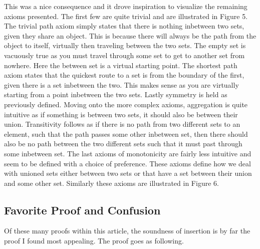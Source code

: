 \documentclass[a4paper,man,natbib]{apa6}
\begin{document}
This was a nice consequence and it drove inspiration to visualize the remaining axioms presented. 
The first few are quite trivial and are illustrated in Figure 5. 
The trivial path axiom simply states that there is nothing inbetween two sets, given they share an object. 
This is because there will always be the path from the object to itself, virtually then traveling between the two sets.
The empty set is vacuously true as you must travel through some set to get to another set from nowhere. 
Here the between set is a virtual starting point. 
The shortest path axiom states that the quickest route to a set is from the boundary of the first, given there is a set inbetween the two. 
This makes sense as you are virtually starting from a point inbetween the two sets. 
Lastly symmetry is held as previously defined. 
Moving onto the more complex axioms, aggregation is quite intuitive as if something is between two sets, it should also be between their union. 
Transitivity follows as if there is no path from two different sets to an element, such that the path passes some other inbetween set, then there should also be no path between the two different sets such that it must past through some inbetween set.
The last axioms of monotonicity are fairly less intuitive and seem to be defined with a choice of preference. These axioms define how we deal with unioned sets either between two sets or that have a set between their union and some other set.
Similarly these axioms are illustrated in Figure 6. 




\subsection{Favorite Proof and Confusion}

      Of these many proofs within this article, the soundness of insertion is by far the proof I found most appealing.
The proof goes as following.
\end{document}
